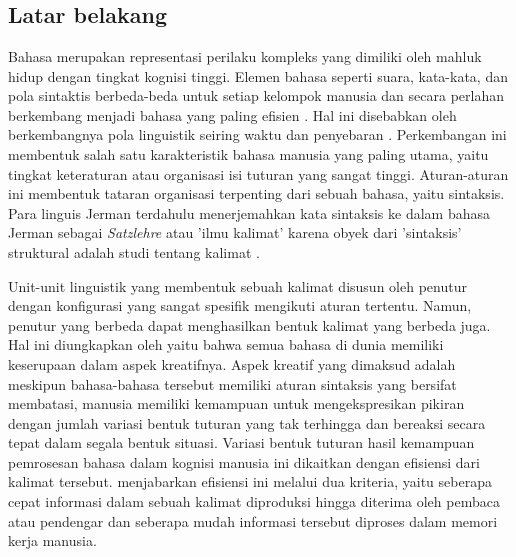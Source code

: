                 
\onehalfspacing
\chapter{\babSatu}

\section{Latar belakang}
Bahasa merupakan representasi perilaku kompleks yang dimiliki oleh mahluk hidup dengan tingkat kognisi tinggi. Elemen bahasa seperti suara, kata-kata, dan pola sintaktis berbeda-beda untuk setiap kelompok manusia dan secara perlahan berkembang menjadi bahasa yang paling efisien \citep[p. 6]{aitchison2004change}. Hal ini disebabkan oleh berkembangnya pola linguistik seiring waktu dan penyebaran \citep{sapir1921intro}. Perkembangan ini membentuk salah satu karakteristik bahasa manusia yang paling utama, yaitu tingkat keteraturan atau organisasi isi tuturan yang sangat tinggi. Aturan-aturan ini membentuk tataran organisasi terpenting dari sebuah bahasa, yaitu sintaksis. Para linguis Jerman terdahulu menerjemahkan kata sintaksis ke dalam bahasa Jerman sebagai \textit{Satzlehre} atau 'ilmu kalimat' karena obyek dari 'sintaksis' struktural adalah studi tentang kalimat \citep{tesniere1959elements}.

Unit-unit linguistik yang membentuk sebuah kalimat disusun oleh penutur dengan konfigurasi yang sangat spesifik mengikuti aturan tertentu. Namun, penutur yang berbeda dapat menghasilkan bentuk kalimat yang berbeda juga. Hal ini diungkapkan oleh \citet[pp. 6-8]{chomsky1965syntactic} yaitu bahwa semua bahasa di dunia memiliki keserupaan dalam aspek kreatifnya. Aspek kreatif yang dimaksud adalah meskipun bahasa-bahasa tersebut memiliki aturan sintaksis yang bersifat membatasi, manusia memiliki kemampuan untuk mengekspresikan pikiran dengan jumlah variasi bentuk tuturan yang tak terhingga dan bereaksi secara tepat dalam segala bentuk situasi. Variasi bentuk tuturan hasil kemampuan pemrosesan bahasa dalam kognisi manusia ini dikaitkan dengan efisiensi dari kalimat tersebut. \citet[p. 231]{hawkins2014cross} menjabarkan efisiensi ini melalui dua kriteria, yaitu seberapa cepat informasi dalam sebuah kalimat diproduksi hingga diterima oleh pembaca atau pendengar dan seberapa mudah informasi tersebut diproses dalam memori kerja manusia.

